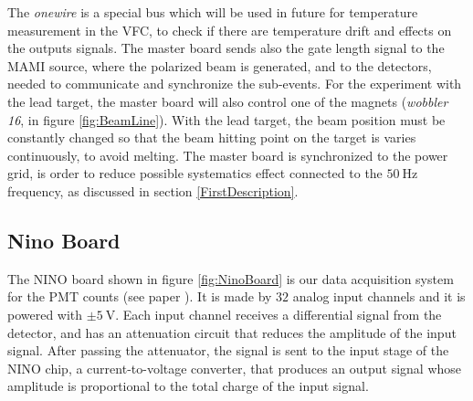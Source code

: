 The \textit{onewire} is a special bus which will be used in future for temperature measurement in the VFC, to check if there are temperature drift and effects on the outputs signals. The master board sends also the gate length signal to the MAMI source, where the polarized beam is generated, and to the detectors, needed to communicate and synchronize the sub-events. 
For the experiment with the lead target, the master board will also control one of the magnets (\textit{wobbler 16}, in figure \ref{fig:BeamLine}). With the lead target, the beam position must be constantly changed so that the beam hitting point on the target is varies continuously, to avoid melting. The master board is synchronized to the power grid, is order to reduce possible systematics effect connected to the $\SI{50}{\hertz}$ frequency, as discussed in section \ref{FirstDescription}.

\subsection{Nino Board} \label{NINO}

The NINO board shown in figure \ref{fig:NinoBoard} is our data acquisition system for the PMT counts (see paper \cite{1352067}). It is made by $32$ analog input channels and it is powered with $\pm \SI{5}{\volt}$.
Each input channel receives a differential signal from the detector, and has an attenuation circuit that reduces the amplitude of the input signal. After passing the attenuator, the signal is sent to the input stage of the NINO chip, a current-to-voltage converter, that produces an output signal whose amplitude is proportional to the total charge of the input signal.


